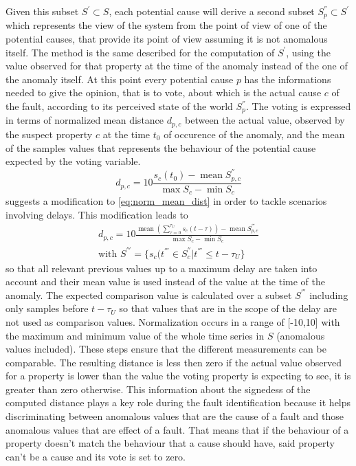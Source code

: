 Given this subset $S^{'}\subset S$, each potential cause will derive a second subset $S^{''}_p\subset S^{'}$ which represents the view of the system from the point of view of one of the potential causes, that provide its point of view assuming it is not anomalous itself. The method is the same described for the computation of $S^{'}$, using the value observed for that property at the time of the anomaly instead of the one of the anomaly itself.
At this point every potential cause $p$ has the informations needed to give the opinion, that is to vote, about which is the actual cause $c$ of the fault, according to its perceived state of the world $S^{''}_p$. The voting is expressed in terms of normalized mean distance $d_{p,c}$ between the actual value, observed by the suspect property $c$ at the time $t_0$ of occurence of the anomaly, and the mean of the samples values that represents the behaviour of the potential cause expected by the voting variable.
\begin{equation}
  \label{eq:norm_mean_dist}
  d_{p,c}=10\frac{s_c(t_0)-\operatorname{mean}S^{''}_{p,c}}{\operatorname{max}S_c-\operatorname{min}S_c}
\end{equation}
\textcite{semantic_diagnoser} suggests a modification to \autoref{eq:norm_mean_dist} in order to tackle scenarios involving delays. This modification leads to
\begin{equation}
  \label{eq:delayed_distance}
  \begin{gathered}
  d_{p,c}=10\frac{\operatorname{mean}(\sum_{\tau=0}^{\tau_{U}}s_c(t-\tau))-\operatorname{mean}S^{'''}_{p,c}}{\operatorname{max}S_c-\operatorname{min}S_c}\\
  \text{with }S^{'''}=\{s_c(t^{'''}\in S_c^{''}|t^{'''}\leq t-\tau_U\}
\end{gathered}
\end{equation}
so that all relevant previous values up to a maximum delay are taken into account and their mean value is used instead of the value at the time of the anomaly. The expected comparison value is calculated over a subset $S^{'''}$ including only samples before $t-\tau_U$ so that values that are in the scope of the delay are not used as comparison values.
Normalization occurs in a range of [-10,10] with the maximum and minimum value of the whole time series in $S$ (anomalous values included). These steps ensure that the different measurements can be comparable.
The resulting distance is less then zero if the actual value observed for a property is lower than the value the voting property is expecting to see, it is greater than zero otherwise. This information about the signedess of the computed distance plays a key role during the fault identification because it helps discriminating between anomalous values that are the cause of a fault and those anomalous values that are effect of a fault. That means that if the behaviour of a property doesn't match the behaviour that a cause should have, said property can't be a cause and its vote is set to zero.
